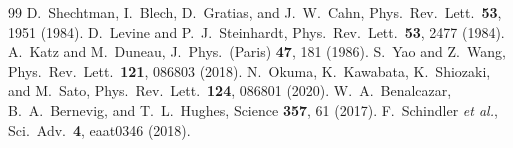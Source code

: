 \documentclass[aps,prx,twocolumn,superscriptaddress,longbibliography,nofootinbib]{revtex4-2}
\begin{document}
\begin{thebibliography}{99}
D.~Shechtman, I.~Blech, D.~Gratias, and J.~W.~Cahn, Phys.\ Rev.\ Lett.\ \textbf{53}, 1951 (1984).
D.~Levine and P.~J.~Steinhardt, Phys.\ Rev.\ Lett.\ \textbf{53}, 2477 (1984).
A.~Katz and M.~Duneau, J.\ Phys.\ (Paris) \textbf{47}, 181 (1986).
S.~Yao and Z.~Wang, Phys.\ Rev.\ Lett.\ \textbf{121}, 086803 (2018).
N.~Okuma, K.~Kawabata, K.~Shiozaki, and M.~Sato, Phys.\ Rev.\ Lett.\ \textbf{124}, 086801 (2020).
W.~A.~Benalcazar, B.~A.~Bernevig, and T.~L.~Hughes, Science \textbf{357}, 61 (2017).
F.~Schindler \textit{et al.}, Sci.\ Adv.\ \textbf{4}, eaat0346 (2018).
\end{thebibliography}
\end{document}
